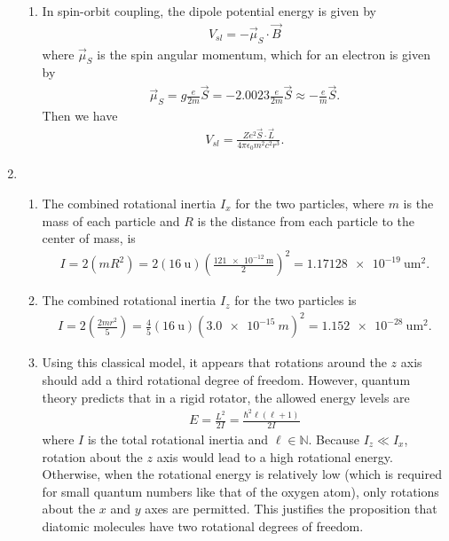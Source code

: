 \documentclass[a4paper,12pt]{article}
\begin{document}
\begin{enumerate}
\begin{enumerate}
            \item
                In spin-orbit coupling, the dipole potential energy is given by
                \begin{align*}
                    V_{sl} = -\vec{\mu}_S \cdot \vec{B}
                \end{align*}
                where $\vec{\mu}_S$ is the spin angular momentum, which for an electron is given by
                \begin{align*}
                    \vec{\mu}_S = g \frac{e}{2m} \vec{S} = -2.0023 \frac{e}{2m} \vec{S} \approx -\frac{e}{m} \vec{S}.
                \end{align*}
                Then we have
                \begin{align*}
                    V_{sl} = \frac{Ze^2 \vec{S} \cdot \vec{L}}{4\pi \epsilon_0 m^2 c^2 r^3}.
                \end{align*}
        \end{enumerate}

    \item
        \begin{enumerate}
            \item
                The combined rotational inertia $I_x$ for the two particles, where $m$ is the mass of each particle and $R$ is the distance from each particle to the center of mass, is
                \begin{align*}
                    I = 2(mR^2) = 2(\SI{16}{\amu}) \left( \frac{\SI{121e-12}{\m}}{2} \right)^2 = \SI{1.17128e-19}{\amu\m\squared}.
                \end{align*}

            \item
                The combined rotational inertia $I_z$ for the two particles is
                \begin{align*}
                    I = 2 \left( \frac{2mr^2}{5} \right) = \frac{4}{5} (\SI{16}{\amu}) (\SI{3.0e-15}{m})^2 = \SI{1.152e-28}{\amu\m\squared}.
                \end{align*}

            \item
                Using this classical model, it appears that rotations around the $z$ axis should add a third rotational degree of freedom. However, quantum theory predicts that in a rigid rotator, the allowed energy levels are
                \begin{align*}
                    E = \frac{L^2}{2I} = \frac{\hbar^2 \ell(\ell + 1)}{2I}
                \end{align*}
                where $I$ is the total rotational inertia and $\ell \in \mathbb{N}$. Because $I_z \ll I_x$, rotation about the $z$ axis would lead to a high rotational energy. Otherwise, when the rotational energy is relatively low (which is required for small quantum numbers like that of the oxygen atom), only rotations about the $x$ and $y$ axes are permitted. This justifies the proposition that diatomic molecules have two rotational degrees of freedom.
        \end{enumerate}


\end{enumerate}
\end{document}
